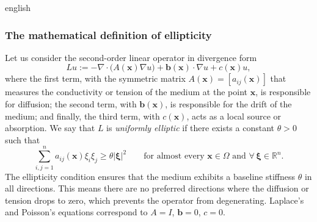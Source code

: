 \documentclass[11pt,letterpaper,twoside,openright]{book} %
\newcommand{\abs}[1]{\left\lvert #1 \right\rvert}
\begin{document}
\begin{hyphenrules}{english}
\subsubsection{The mathematical definition of ellipticity}
Let us consider the second-order linear operator in divergence form
\begin{equation}
  Lu:=-\nabla\cdot\big(A(\mathbf{x})\nabla u\big)+\mathbf{b}(\mathbf{x})\cdot\nabla u+c(\mathbf{x})u,
  \label{eq:elliptic-op}
\end{equation}
where the first term, with the symmetric matrix $A(\mathbf{x})=[a_{ij}(\mathbf{x})]$ that measures the conductivity or
tension of the medium at the point $\mathbf{x}$, is responsible for diffusion; the second term,
with $\mathbf{b}(\mathbf{x})$, is responsible for the drift of the medium; and finally, the third term, with $c(\mathbf{x})$,
acts as a local source or absorption. We say that $L$ is \emph{uniformly elliptic} if there exists a
constant $\theta>0$ such that
\begin{equation}
  \sum_{i,j=1}^{n}a_{ij}(\mathbf{x})\xi_i\xi_j\ge\theta\abs{\bm\xi}^2\qquad
  \text{for almost every }\mathbf{x}\in\Omega\text{ and }\forall\,\bm\xi\in\mathbb{R}^n.
  \label{eq:uniform-ellipticity}
\end{equation}
The ellipticity condition ensures that the medium exhibits a baseline stiffness $\theta$ in all
directions. This means there are no preferred directions where the diffusion or tension drops to zero,
which prevents the operator from degenerating. Laplace's and Poisson's equations correspond to $A=I$,
$\mathbf{b}=0$, $c=0$.


\end{hyphenrules}
\end{document}
